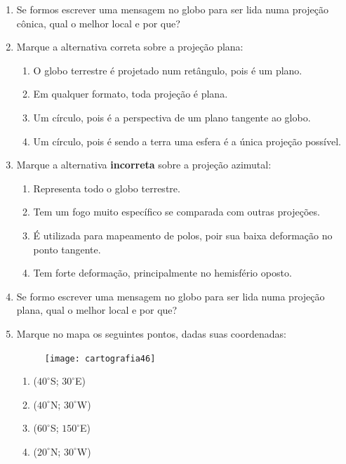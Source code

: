 \begin{enumerate}
\item Se formos escrever uma mensagem no globo para ser lida numa projeção cônica, qual o melhor local e por que?

\item Marque a alternativa correta sobre a projeção plana:
\begin{enumerate}
\item O globo terrestre é projetado num retângulo, pois é um plano.
\item Em qualquer formato, toda projeção é plana.
\item Um círculo, pois é a perspectiva de um plano tangente ao globo.
\item Um círculo, pois é sendo a terra uma esfera é a única projeção possível.
\end{enumerate}

\item Marque a alternativa \textbf{incorreta} sobre a projeção azimutal:
\begin{enumerate}
\item Representa todo o globo terrestre.
\item Tem um fogo muito específico se comparada com outras projeções.
\item É utilizada para mapeamento de polos, poir sua baixa deformação no ponto tangente.
\item Tem forte deformação, principalmente no hemisfério oposto.
\end{enumerate}

\item Se formo escrever uma mensagem no globo para ser lida numa projeção plana, qual o melhor local e por que?

\item Marque no mapa os seguintes pontos, dadas suas coordenadas:

\begin{figure}[H]
\centering
\texttt{[image: cartografia46]}

\end{figure}

\begin{enumerate}
\item ($40^{\circ}$S; $30^{\circ}$E)
\item ($40^{\circ}$N; $30^{\circ}$W)
\item ($60^{\circ}$S; $150^{\circ}$E)
\item ($20^{\circ}$N; $30^{\circ}$W)
\end{enumerate}


\end{enumerate}
